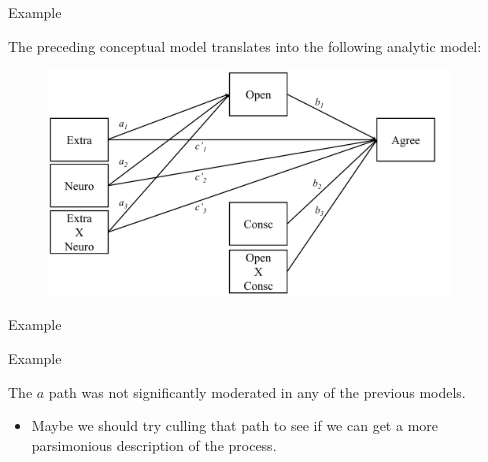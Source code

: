 \documentclass{beamer}
\newcommand{\va}[0]{\vspace{12pt}}
\newcommand{\vb}[0]{\vspace{6pt}}
\begin{document}
\begin{frame}{Example}
  
  The preceding conceptual model translates into the following
  analytic model: 
  \vb
  \begin{figure}
    \includegraphics[width=0.95\textwidth]{figures/example4Analytic.pdf}
  \end{figure}
  
\end{frame}




\begin{frame}[allowframebreaks]{Example}



\pagebreak



\pagebreak



\end{frame}



\begin{frame}[allowframebreaks]{Example}

  The $a$ path was not significantly moderated in any of the previous
  models.
  \begin{itemize}
    \item Maybe we should try culling that path to see if we can get a
      more parsimonious description of the process.  
  \end{itemize}
  \va


\pagebreak



\pagebreak



\end{frame}
\end{document}
